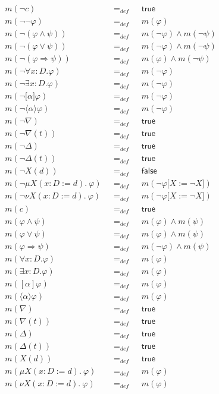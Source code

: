 \documentclass{article}
\begin{document}
\begin{equation*}
\begin{array}{lll}
m(\lnot c) & =_{def} & \mathsf{true} \\
m(\lnot \lnot \varphi ) & =_{def} & m(\varphi ) \\
m(\lnot (\varphi \wedge \psi )) & =_{def} & m(\lnot \varphi )\wedge m(\lnot
\psi ) \\
m(\lnot (\varphi \vee \psi )) & =_{def} & m(\lnot \varphi )\wedge m(\lnot
\psi ) \\
m(\lnot (\varphi \Rightarrow \psi )) & =_{def} & m(\varphi )\wedge m(\lnot
\psi ) \\
m(\lnot \forall {x{:}D}.\varphi ) & =_{def} & m(\lnot \varphi ) \\
m(\lnot \exists {x{:}D}.\varphi ) & =_{def} & m(\lnot \varphi ) \\
m(\lnot \lbrack \alpha ]\varphi ) & =_{def} & m(\lnot \varphi ) \\
m(\lnot \langle \alpha \rangle \varphi ) & =_{def} & m(\lnot \varphi ) \\
m(\lnot \nabla ) & =_{def} & \mathsf{true} \\
m(\lnot \nabla (t)) & =_{def} & \mathsf{true} \\
m(\lnot \Delta ) & =_{def} & \mathsf{true} \\
m(\lnot \Delta (t)) & =_{def} & \mathsf{true} \\
m(\lnot X(d)) & =_{def} & \mathsf{false} \\
m(\lnot \mu X(x{:}D:=d).~\varphi )~~~ & =_{def}~~~ & m(\lnot \varphi \lbrack
X:=\lnot X]) \\
m(\lnot \nu X(x{:}D:=d).~\varphi )~~~ & =_{def}~~~ & m(\lnot \varphi \lbrack
X:=\lnot X]) \\
m(c) & =_{def} & \mathsf{true} \\
m(\varphi \wedge \psi ) & =_{def} & m(\varphi )\wedge m(\psi ) \\
m(\varphi \vee \psi ) & =_{def} & m(\varphi )\wedge m(\psi ) \\
m(\varphi \Rightarrow \psi ) & =_{def} & m(\lnot \varphi )\wedge m(\psi ) \\
m(\forall {x{:}D}.\varphi ) & =_{def} & m(\varphi ) \\
m(\exists {x{:}D}.\varphi ) & =_{def} & m(\varphi ) \\
m([\alpha ]\varphi ) & =_{def} & m(\varphi ) \\
m(\langle \alpha \rangle \varphi ) & =_{def} & m(\varphi ) \\
m(\nabla ) & =_{def} & \mathsf{true} \\
m(\nabla (t)) & =_{def} & \mathsf{true} \\
m(\Delta ) & =_{def} & \mathsf{true} \\
m(\Delta (t)) & =_{def} & \mathsf{true} \\
m(X(d)) & =_{def} & \mathsf{true} \\
m(\mu X(x{:}D:=d).~\varphi )~~~ & =_{def}~~~ & m(\varphi ) \\
m(\nu X(x{:}D:=d).~\varphi )~~~ & =_{def}~~~ & m(\varphi )%
\end{array}%
\end{equation*}
\end{document}
